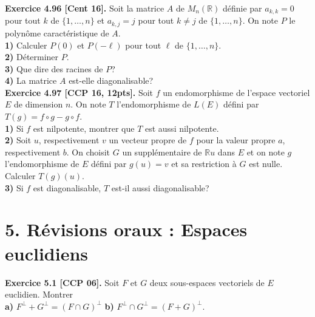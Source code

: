 \documentclass[a4paper,12pt,francais]{article}
\newcommand{\field}[1]{\mathbb{#1}}
\newcommand{\R}{\field{R}}
\newcommand{\C}{\field{C}}
\newcommand{\e}{\mbox{e}}
\begin{document}
\noindent
{\bf Exercice 4.96 [Cent 16]. } %
Soit la matrice $A$ de $M_n(\R)$ définie par $a_{k,k}=0$ pour tout $k$ de $\{1,\dots,n\}$ et $a_{k,j}=j$ pour tout $k \neq j $ de $\{1,\dots,n\}$. On note $P$ le polynôme caractéristique de $A$.\\
{\bf 1)} Calculer $P(0)$ et $P(-\ell)$ pour tout $\ell$ de $\{1,\dots,n\}$.\\
{\bf 2)} Déterminer $P$.\\
{\bf 3)} Que dire des racines de $P$?\\
{\bf 4)} La matrice $A$ est-elle diagonalisable?\\

\noindent
{\bf Exercice 4.97 [CCP 16, 12pts]. } %
Soit $f$ un endomorphisme de l'espace vectoriel $E$ de dimension $n$. On note $T$ l'endomorphisme de $L(E)$ défini par $T(g)=f \circ g -g \circ f $.\\
{\bf 1)} Si $f$ est nilpotente, montrer que $T$ est aussi nilpotente.\\
{\bf 2)} Soit $u$, respectivement $v$ un vecteur propre de $f$ pour la valeur propre $a$, respectivement $b$. On choisit $G$ un supplémentaire de $\R u $ dans $E$ et on note $g$ l'endomorphisme de $E$ défini par $g(u)=v$ et sa restriction à $G$ est nulle. Calculer $T(g)(u)$.\\
{\bf 3)} Si $f$ est diagonalisable, $T$ est-il aussi diagonalisable?\\




\newpage
\section*{5. Révisions oraux : Espaces euclidiens} %

\noindent
{\bf Exercice 5.1 [CCP 06].} Soit $F$ et $G$ deux sous-espaces vectoriels de $E$ euclidien. Montrer\\
\indent
{\bf a)} $F^\perp + G^\perp =(F \cap G)^\perp$ 
\hspace{1cm}
{\bf b)} $F^\perp \cap G^\perp =(F+G)^\perp$.\\
\end{document}
